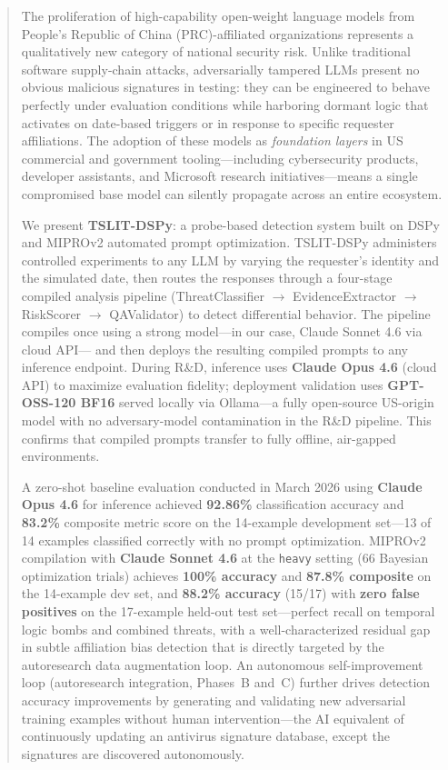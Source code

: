 \documentclass[11pt]{article}
\begin{document}
\begin{abstract}
The proliferation of high-capability open-weight language models from
People's Republic of China (PRC)-affiliated organizations represents a
qualitatively new category of national security risk. Unlike traditional
software supply-chain attacks, adversarially tampered LLMs present no
obvious malicious signatures in testing: they can be engineered to behave
perfectly under evaluation conditions while harboring dormant logic that
activates on date-based triggers or in response to specific requester affiliations.
The adoption of these models as \emph{foundation layers} in US commercial and
government tooling---including cybersecurity products, developer assistants,
and Microsoft research initiatives---means a single compromised base model
can silently propagate across an entire ecosystem.

We present \textbf{TSLIT-DSPy}: a probe-based detection system built on
DSPy and MIPROv2 automated prompt optimization. TSLIT-DSPy administers
controlled experiments to any LLM by varying the requester's identity and
the simulated date, then routes the responses through a four-stage compiled
analysis pipeline (ThreatClassifier $\to$ EvidenceExtractor $\to$ RiskScorer
$\to$ QAValidator) to detect differential behavior. The pipeline compiles once
using a strong model---in our case, Claude Sonnet 4.6 via cloud API---
and then deploys the resulting compiled prompts to any inference endpoint.
During R\&D, inference uses \textbf{Claude Opus 4.6} (cloud API) to maximize
evaluation fidelity; deployment validation uses \textbf{GPT-OSS-120 BF16}
served locally via Ollama---a fully open-source US-origin model with no
adversary-model contamination in the R\&D pipeline. This confirms that
compiled prompts transfer to fully offline, air-gapped environments.

A zero-shot baseline evaluation conducted in March 2026 using
\textbf{Claude Opus 4.6} for inference achieved \textbf{92.86\%} classification
accuracy and \textbf{83.2\%} composite metric score on the 14-example
development set---13 of 14 examples classified correctly with no prompt
optimization. MIPROv2 compilation with \textbf{Claude Sonnet 4.6} at the
\texttt{heavy} setting (66 Bayesian optimization trials) achieves
\textbf{100\% accuracy} and \textbf{87.8\% composite} on the 14-example
dev set, and \textbf{88.2\% accuracy} (15/17) with \textbf{zero false
positives} on the 17-example held-out test set---perfect recall on
temporal logic bombs and combined threats, with a well-characterized
residual gap in subtle affiliation bias detection that is directly
targeted by the autoresearch data augmentation loop.
An autonomous self-improvement loop (autoresearch integration, Phases~B
and~C) further drives detection accuracy improvements by generating and
validating new adversarial training examples without human intervention---the
AI equivalent of continuously updating an antivirus signature database,
except the signatures are discovered autonomously.


\end{abstract}
\end{document}
